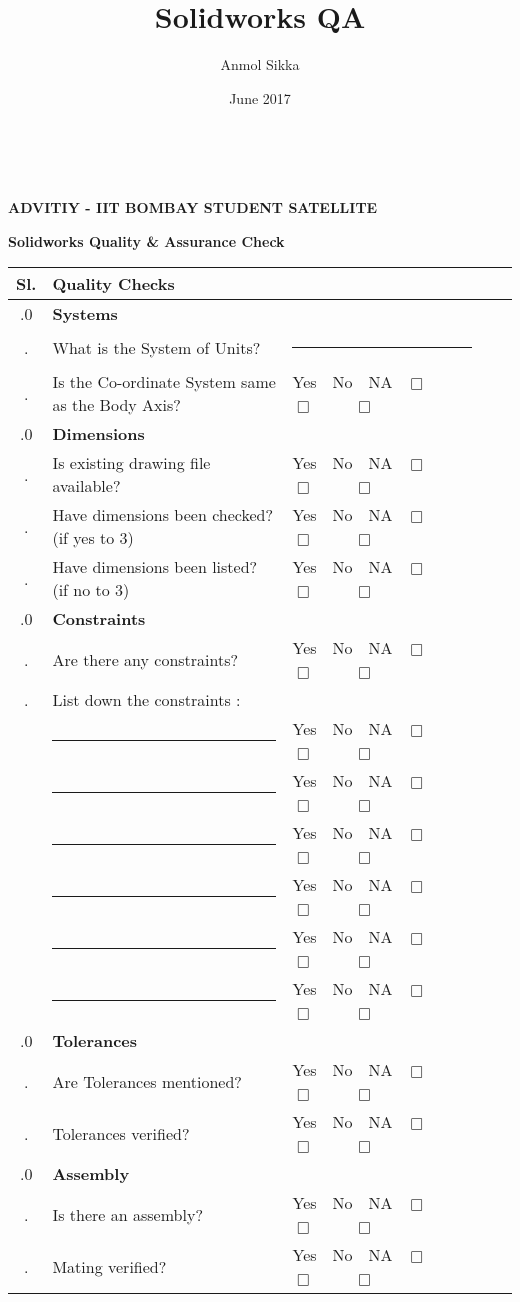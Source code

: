 \documentclass{article}
\title{Solidworks QA}
\author{Anmol Sikka}
\date{June 2017}
\begin{document}
{%
\sffamily
\centering
\Large

~\vspace{\fill}

{\LARGE 
\bfseries{ADVITIY - IIT BOMBAY STUDENT SATELLITE}
}

\vspace{.5cm}

{\LARGE
\bfseries{Solidworks Quality \& Assurance Check\\}
}
}


\setcounter{hnumber}{0}

\newcommand{\yesno}{\textsf{Yes}~~\textsf{No}~~\textsf{NA} {\Large ~$\Box$}~~~~   {\Large $\Box$}~~~~{\Large ~$\Box$}}

\newcommand{\boxquestion}[1]{
    \hfill \relax \thehnumber.\theqnumber\hfill\hfill &\textsf{#1} &{\small\yesno} \stepcounter{qnumber}\\ \hline
}
\newcommand{\question}[1]{
    \hfill \relax \thehnumber.\theqnumber\hfill\hfill &\textsf{#1} &\hrule 
    \stepcounter{qnumber}\\ \hline
}
\newcommand{\checklist}[1]{
    \hfill \relax \thehnumber.\theqnumber\hfill\hfill &\textsf{#1} &
    \stepcounter{qnumber}\\
    \hfill \relax\hfill\hfill &\hrule &{\small\yesno}
    \\
    \hfill \relax\hfill\hfill &\hrule &{\small\yesno}
    \\
    \hfill \relax\hfill\hfill &\hrule &{\small\yesno}
    \\
    \hfill \relax\hfill\hfill &\hrule &{\small\yesno}
    \\
    \hfill \relax\hfill\hfill &\hrule &{\small\yesno}
    \\
    \hfill \relax\hfill\hfill &\hrule &{\small\yesno}
    \\\hline
}


\newcommand{\heading}[1]{
 \stepcounter{hnumber}
 \thehnumber.0 &\multicolumn{4}{|l|}{\bf\textsf{#1}}\\ \hline %
 \setcounter{qnumber}{0}
 \stepcounter{qnumber}

}
 
 
 \begin{longtable}{|c| m{10cm}|m{2cm}|b{1.5cm}|  b{1.55cm} |}
\hline
Sl.     &Quality Checks &  \\
\hline\hline
\heading{Systems}
\question{What is the System of Units?}
\boxquestion{Is the Co-ordinate System same as the Body Axis?}
\heading{Dimensions}
  \boxquestion{Is existing drawing file available?}
  \boxquestion{Have dimensions been checked? (if yes to 3)}
  \boxquestion{Have dimensions been listed? (if no to 3)}
\heading{Constraints}
    \boxquestion{Are there any constraints?}
    \checklist{List down the constraints :}
\heading{Tolerances}
    \boxquestion{Are Tolerances mentioned?}
    \boxquestion{Tolerances verified?}
\heading{Assembly}
    \boxquestion{Is there an assembly?}
    \boxquestion{Mating verified?}
\end{longtable}
\end{document}
